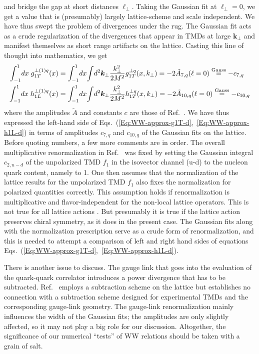\documentclass[a4paper,11pt]{article}
\newcommand{\Bernie}[1]{{\color[rgb]{0,0.5,0.75}#1}}
\newcommand{\Gaussian}{\ensuremath{\stackrel{\text{\scriptsize Gauss}}{=}}}
\def\bflperp{{\bm \ell}_\perp}
\def\bfkperp{{\bm k}_\perp}
\def\kperp{k_\perp}
\begin{document}
and bridge the gap at short distances $\bflperp$.
Taking the Gaussian fit at $\bflperp = 0$, we get a value that is
(presumably) largely lattice-scheme and scale independent. We have thus
swept the problem of divergences under the rug. The Gaussian fit acts as
a crude regularization of the divergences that appear in TMDs at large
$\bfkperp$ and manifest themselves as short range artifacts on the lattice.
Casting this line of thought into mathematics, we get
\begin{align}
    	\int_{-1}^1 \! d x\; g_{1T}^{\perp(1)q}(x)
	&=  \int_{-1}^1 \! d x \! \int \! d^2 \bfkperp
	\frac{\kperp^2}{2M^2} g_{1T}^{\perp q}(x,\kperp)
	= -2 \tilde{A}_{7,q}( \ell = 0 )
	\Gaussian
	 -c_{7,q}  \\
    	\int_{-1}^1 \! d x\; h_{1L}^{\perp(1)q}(x)
	&=  \int_{-1}^1 \! d x \! \int \!  d^2 \bfkperp
	\frac{\kperp^2}{2M^2} h_{1T}^{\perp q}(x,\kperp)
	= -2 \tilde{A}_{10,q}( \ell = 0 )
	\Gaussian
	-c_{10,q} 
\end{align}
where the amplitudes $\tilde{A}$ and constants $c$ are those of Ref.~\cite{Musch:2010ka}.
We have thus expressed the left-hand side of
Eqs.~(\ref{Eq:WW-approx-g1T-d},~\ref{Eq:WW-approx-h1L-d}) in terms of
amplitudes $c_{7,q}$ and $c_{10,q}$ of the Gaussian fits on the lattice.
Before quoting numbers, a few more comments are in order. The overall
multiplicative renormalization in Ref.~\cite{Musch:2010ka} was fixed by
setting the Gaussian integral $c_{2,u-d}$ of the unpolarized TMD $f_1$
in the isovector channel (u-d) to the nucleon quark content, namely to 1.
One then assumes that the normalization of the lattice results for the
unpolarized TMD $f_1$ also fixes the normalization for polarized quantities
correctly. 
\Bernie{This assumption holds if renormalization is multiplicative and
   flavor-independent for the non-local lattice operators. This is
   not true for all lattice actions \cite{Yoon:2017qzo}. %
   But presumably it is true
   if the lattice action preserves chiral symmetry, as it does in
   the present case.} 
The Gaussian fits along with the normalization prescription serve as
a crude form of renormalization, and this is needed to attempt
a comparison of left and right hand sides of equations
Eqs.~(\ref{Eq:WW-approx-g1T-d},~\ref{Eq:WW-approx-h1L-d}).

There is another issue to discuss.
The gauge link that goes into the evaluation of the quark-quark correlator
introduces a power divergence that has to be subtracted.
Ref.~\cite{Musch:2010ka} employs a subtraction scheme on the lattice
but establishes no connection with a subtraction scheme designed for
experimental TMDs and the corresponding gauge-link geometry.
The gauge-link renormalization mainly
influences the width of the Gaussian fits; the amplitudes are only slightly
affected, so it may not play a big role for our discussion. Altogether, the
significance of our numerical ``tests'' of WW relations should be taken
with a grain of salt.
\end{document}
